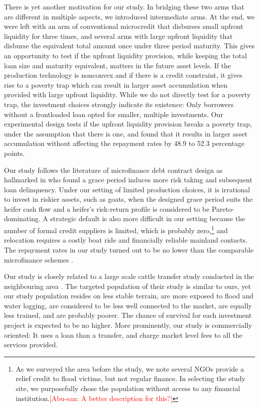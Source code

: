 	There is yet another motivation for our study. In bridging these two arms that are different in multiple aspects, we introduced intermediate arms. At the end, we were left with an arm of conventional microcredit that disburses small upfront liquidity for three times, and several arms with large upfront liquidity that disburse the equivalent total amount once under three period maturity. This gives an opportunity to test if the upfront liquidity provision, while keeping the total loan size and maturity equivalent, matters in the future asset levels. If the production technology is nonconvex and if there is a credit constraint, it gives rise to a poverty trap which can result in larger asset accumulation when provided with large upfront liquidity. While we do not directly test for a poverty trap, the investment choices strongly indicate its existence: Only borrowers without a frontloaded loan opted for smaller, multiple investments. Our experimental design tests if the upfront liquidity provision breaks a poverty trap, under the assumption that there is one, and found that it results in larger asset accumulation without affecting the repayment rates by 48.9 to 52.3 percentage points.

	Our study follows the literature of microfinance debt contract design as hallmarked in \citet{Field2013} who found a grace period induces more risk taking and subsequent loan delinquency. Under our setting of limited production choices, it is irrational to invest in riskier assets, such as goats, when the designed grace period suits the heifer cash flow and a heifer's risk-return profile is considered to be Pareto-dominating. A strategic default is also more difficult in our setting because the number of formal credit suppliers is limited, which is probably zero,\footnote{As we surveyed the area before the study, we note several NGOs provide a relief credit to flood victims, but not regular finance. In selecting the study site, we purposefully chose the population without access to any financial institution.\textcolor{red}{[Abu-san: A better description for this?]} } and relocation requires a costly boat ride and financially reliable mainland contacts. The repayment rates in our study turned out to be no lower than the comparable microfinance schemes \citep{BanerjeeKarlanZinman2015}.

	Our study is closely related to a large scale cattle transfer study conducted in the neighbouring area \citep{BandieraBRAC2017, Balboni2020}. The targeted population of their study is similar to ours, yet our study population resides on less stable terrain, are more exposed to flood and water logging, are considered to be less well connected to the market, are equally less trained, and are probably poorer. The chance of survival for each investment project is expected to be no higher. More prominently, our study is commercially oriented: It uses a loan than a transfer, and charge market level fees to all the services provided. 
	



